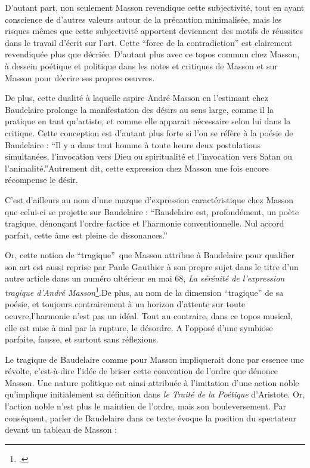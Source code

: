 	D’autant part, non seulement Masson revendique cette subjectivité, tout en ayant conscience de d’autres valeurs autour de la précaution minimalisée, mais les risques mêmes que cette subjectivité apportent deviennent des motifs de réussites dans le travail d’écrit sur l’art. Cette \enquote{force de la contradiction} est clairement revendiquée plus que décriée. D’autant plus avec ce topos commun chez Masson, à dessein poétique et politique dans les notes et critiques de Masson et sur Masson pour décrire ses propres oeuvres. 

	De plus, cette dualité à laquelle aspire André Masson en l’estimant chez Baudelaire prolonge la manifestation des désirs au sens large, comme il la pratique en tant qu’artiste, et comme elle apparait nécessaire selon lui dans la critique. Cette conception est d’autant plus forte si l’on se réfère à la poésie de Baudelaire : \enquote{Il y a dans tout homme à toute heure deux postulations simultanées, l’invocation vers Dieu ou spiritualité et l’invocation vers Satan ou l’animalité.}Autrement dit, cette expression chez Masson une fois encore récompense le désir. 

	C’est d’ailleurs au nom d’une marque d’expression caractéristique chez Masson que celui-ci se projette sur Baudelaire : \enquote{Baudelaire est, profondément, un poète tragique, dénonçant l’ordre factice et l’harmonie conventionnelle. Nul accord parfait, cette âme est pleine de dissonances.}

	Or, cette notion de \enquote{tragique} que Masson attribue à Baudelaire pour qualifier son art est aussi reprise par Paule Gauthier à son propre sujet dans le titre d’un autre article dans un numéro ultérieur en mai 68, \emph{La sérénité de l’expression tragique d’André Masson}\footcite{expressiontragique}.De plus, au nom de la dimension \enquote{tragique} de sa poésie, et toujours contrairement à un horizon d’attente sur toute oeuvre,l’harmonie n’est pas un idéal. Tout au contraire, dans ce topos musical, elle est mise à mal par la rupture, le désordre. A l’opposé d’une symbiose parfaite, fausse, et surtout sans réflexions.


	
 Le tragique de Baudelaire comme pour Masson impliquerait donc par essence une révolte, c’est-à-dire l’idée de briser cette convention de l’ordre que dénonce Masson. Une nature politique est ainsi attribuée à l’imitation d’une action noble qu’implique initialement sa définition dans \emph{le Traité de la Poétique} d’Aristote. Or, l’action noble n’est plus le maintien de l’ordre, mais son bouleversement. Par conséquent, parler de Baudelaire dans ce texte évoque la position du spectateur devant un tableau de Masson : 

